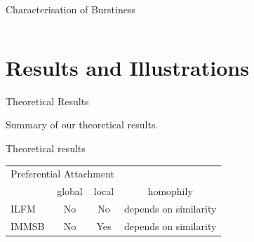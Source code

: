 \begin{frame}[c]{Characterisation of Burstiness}
\begin{columns}[t]
\begin{column}{0.5\textwidth}
        \end{column}
    \end{columns}

\end{frame}



\section{Results and Illustrations}

\begin{frame}[c]{Theoretical Results}

    Summary of our theoretical results. 
    \vspace{1cm}


    \begin{block}{Theoretical results}
	\begin{tabular}{l|cc|c}

        \multicolumn{3}{c}{\hspace{1.3cm}Preferential Attachment}   \\
        \cmidrule(l){2-3} 
        &   global & local  &   homophily      \\
        \hline
        ILFM       & \cellcolor{red!25}No & \cellcolor{red!25}No   & depends on similarity  \\
        IMMSB       & \cellcolor{red!25}No & \cellcolor{green!25}Yes  & depends on similarity \\
    \end{tabular}

    \end{block}

\end{frame}

